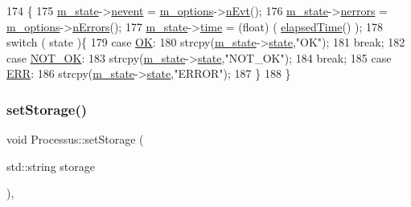 \begin{DoxyCode}
174                                      \{
175   \hyperlink{classProcessus_ab3539eee42891ceae0baf4395ae7fb61}{m\_state}->\hyperlink{structProcState_a1881d6b0db849a8af15f586ad5959260}{nevent}  = \hyperlink{classProcessus_a74205f3c1e00c4448f7b3257c2351797}{m\_options}->\hyperlink{classOptions_ad769b256263a4ac24dd6f989ae724ab7}{nEvt}();
176   \hyperlink{classProcessus_ab3539eee42891ceae0baf4395ae7fb61}{m\_state}->\hyperlink{structProcState_a51a0f54ba62b07e07ac8518c5f32828d}{nerrors} = \hyperlink{classProcessus_a74205f3c1e00c4448f7b3257c2351797}{m\_options}->\hyperlink{classOptions_acc6474323f0bbe17fa844e9a086b90b8}{nErrors}();
177   \hyperlink{classProcessus_ab3539eee42891ceae0baf4395ae7fb61}{m\_state}->\hyperlink{structProcState_a88c69b099d8f2b2164d478f28e87610f}{time}    = (float) ( \hyperlink{classProcessus_aecca96218c65bc805c988cd95447df55}{elapsedTime}() );
178   \textcolor{keywordflow}{switch} ( state )\{
179   \textcolor{keywordflow}{case} \hyperlink{classProcessus_a36278773bd98f2d5612fea40c7774821af77c64124fa175f28200166fff165ea2}{OK}:
180     strcpy(\hyperlink{classProcessus_ab3539eee42891ceae0baf4395ae7fb61}{m\_state}->\hyperlink{structProcState_aaffb70e5af437e2c0d4dfc69bd0b24cd}{state},\textcolor{stringliteral}{"OK"});
181     \textcolor{keywordflow}{break};
182   \textcolor{keywordflow}{case} \hyperlink{classProcessus_a36278773bd98f2d5612fea40c7774821a629082f49d6e8df6b6da2b8fbb9d80fb}{NOT\_OK}:
183     strcpy(\hyperlink{classProcessus_ab3539eee42891ceae0baf4395ae7fb61}{m\_state}->\hyperlink{structProcState_aaffb70e5af437e2c0d4dfc69bd0b24cd}{state},\textcolor{stringliteral}{"NOT\_OK"});
184     \textcolor{keywordflow}{break};
185   \textcolor{keywordflow}{case} \hyperlink{classProcessus_a36278773bd98f2d5612fea40c7774821adaf73ad5d0a09f952d0f18dbbe1c7493}{ERR}:
186     strcpy(\hyperlink{classProcessus_ab3539eee42891ceae0baf4395ae7fb61}{m\_state}->\hyperlink{structProcState_aaffb70e5af437e2c0d4dfc69bd0b24cd}{state},\textcolor{stringliteral}{"ERROR"});
187   \}
188 \}
\end{DoxyCode}
\mbox{\label{classProcessus_ad57a29b33f9021eda9f6929136f1784f}} 
\subsubsection{\texorpdfstring{set\+Storage()}{setStorage()}}
{\footnotesize\ttfamily void Processus\+::set\+Storage (\begin{DoxyParamCaption}\item[{std\+::string}]{storage }\end{DoxyParamCaption})\hspace{0.3cm}{\ttfamily [inline]}, {\ttfamily [inherited]}}

